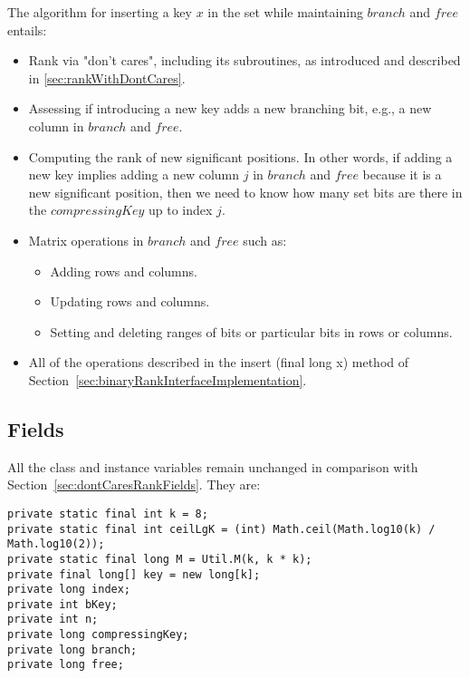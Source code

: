 The algorithm for inserting a key $x$ in the set while maintaining $branch$ and $free$ entails:
\begin{itemize}
    \item
    Rank via "don't cares", including its subroutines, as introduced and described in \ref{sec:rankWithDontCares}.
    
    \item
    Assessing if introducing a new key adds a new branching bit, e.g., a new column in $branch$ and $free$.
    
    \item
    Computing the rank of new significant positions. In other words, if adding a new key implies adding a new column $j$ in $branch$ and $free$ because it is a new significant position, then we need to know how many set bits are there in the $compressingKey$ up to index $j$.
    
    \item
    Matrix operations in $branch$ and $free$ such as:
    \begin{itemize}
        \item
        Adding rows and columns.
        
        \item
        Updating rows and columns.
        
        \item
        Setting and deleting ranges of bits or particular bits in rows or columns.
    \end{itemize}
    
    \item
    All of the operations described in the {\ttfamily insert (final long x)} method of Section~\ref{sec:binaryRankInterfaceImplementation}.
\end{itemize}

\subsection{Fields} \label{sec:dontCaresInsertFields}

All the class and instance variables remain unchanged in comparison with Section~\ref{sec:dontCaresRankFields}. They are:
\begin{lstlisting}
private static final int k = 8;
private static final int ceilLgK = (int) Math.ceil(Math.log10(k) / Math.log10(2));
private static final long M = Util.M(k, k * k);
private final long[] key = new long[k];
private long index;
private int bKey;
private int n;
private long compressingKey;
private long branch;
private long free;
\end{lstlisting}


